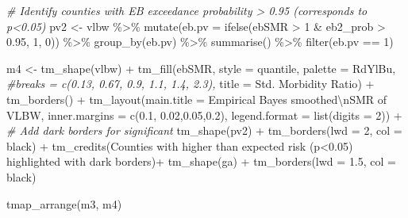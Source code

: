 \documentclass[
]{book}
\newenvironment{Shaded}{\begin{snugshade}}{\end{snugshade}}
\newcommand{\AttributeTok}[1]{\textcolor[rgb]{0.77,0.63,0.00}{#1}}
\newcommand{\CommentTok}[1]{\textcolor[rgb]{0.56,0.35,0.01}{\textit{#1}}}
\newcommand{\DecValTok}[1]{\textcolor[rgb]{0.00,0.00,0.81}{#1}}
\newcommand{\FloatTok}[1]{\textcolor[rgb]{0.00,0.00,0.81}{#1}}
\newcommand{\FunctionTok}[1]{\textcolor[rgb]{0.00,0.00,0.00}{#1}}
\newcommand{\NormalTok}[1]{#1}
\newcommand{\OtherTok}[1]{\textcolor[rgb]{0.56,0.35,0.01}{#1}}
\newcommand{\SpecialCharTok}[1]{\textcolor[rgb]{0.00,0.00,0.00}{#1}}
\newcommand{\StringTok}[1]{\textcolor[rgb]{0.31,0.60,0.02}{#1}}
\begin{document}
\begin{Shaded}
\begin{Highlighting}[]
\CommentTok{\# Identify counties with EB exceedance probability \textgreater{} 0.95 (corresponds to p\textless{}0.05)}
\NormalTok{pv2 }\OtherTok{\textless{}{-}}\NormalTok{ vlbw }\SpecialCharTok{\%\textgreater{}\%}
  \FunctionTok{mutate}\NormalTok{(}\AttributeTok{eb.pv =} \FunctionTok{ifelse}\NormalTok{(ebSMR }\SpecialCharTok{\textgreater{}} \DecValTok{1} \SpecialCharTok{\&}\NormalTok{ eb2\_prob }\SpecialCharTok{\textgreater{}} \FloatTok{0.95}\NormalTok{, }\DecValTok{1}\NormalTok{, }\DecValTok{0}\NormalTok{)) }\SpecialCharTok{\%\textgreater{}\%}
  \FunctionTok{group\_by}\NormalTok{(eb.pv) }\SpecialCharTok{\%\textgreater{}\%}
  \FunctionTok{summarise}\NormalTok{() }\SpecialCharTok{\%\textgreater{}\%}
  \FunctionTok{filter}\NormalTok{(eb.pv }\SpecialCharTok{==} \DecValTok{1}\NormalTok{)}

\NormalTok{m4 }\OtherTok{\textless{}{-}} \FunctionTok{tm\_shape}\NormalTok{(vlbw) }\SpecialCharTok{+}
  \FunctionTok{tm\_fill}\NormalTok{(}\StringTok{\textquotesingle{}ebSMR\textquotesingle{}}\NormalTok{,}
          \AttributeTok{style =} \StringTok{\textquotesingle{}quantile\textquotesingle{}}\NormalTok{,}
          \AttributeTok{palette =} \StringTok{\textquotesingle{}{-}RdYlBu\textquotesingle{}}\NormalTok{,}
          \CommentTok{\#breaks = c(0.13, 0.67, 0.9, 1.1, 1.4, 2.3),}
          \AttributeTok{title =} \StringTok{\textquotesingle{}Std. Morbidity Ratio\textquotesingle{}}\NormalTok{) }\SpecialCharTok{+} 
  \FunctionTok{tm\_borders}\NormalTok{() }\SpecialCharTok{+}
  \FunctionTok{tm\_layout}\NormalTok{(}\AttributeTok{main.title =} \StringTok{\textquotesingle{}Empirical Bayes smoothed}\SpecialCharTok{\textbackslash{}n}\StringTok{SMR of VLBW\textquotesingle{}}\NormalTok{,}
            \AttributeTok{inner.margins =} \FunctionTok{c}\NormalTok{(}\FloatTok{0.1}\NormalTok{, }\FloatTok{0.02}\NormalTok{,}\FloatTok{0.05}\NormalTok{,}\FloatTok{0.2}\NormalTok{),}
            \AttributeTok{legend.format =} \FunctionTok{list}\NormalTok{(}\AttributeTok{digits =} \DecValTok{2}\NormalTok{)) }\SpecialCharTok{+}
  \CommentTok{\# Add dark borders for significant}
  \FunctionTok{tm\_shape}\NormalTok{(pv2) }\SpecialCharTok{+}
  \FunctionTok{tm\_borders}\NormalTok{(}\AttributeTok{lwd =} \DecValTok{2}\NormalTok{, }\AttributeTok{col =} \StringTok{\textquotesingle{}black\textquotesingle{}}\NormalTok{) }\SpecialCharTok{+}
  \FunctionTok{tm\_credits}\NormalTok{(}\StringTok{\textquotesingle{}Counties with higher than expected risk (p\textless{}0.05) highlighted with dark borders\textquotesingle{}}\NormalTok{)}\SpecialCharTok{+}
  \FunctionTok{tm\_shape}\NormalTok{(ga) }\SpecialCharTok{+}
  \FunctionTok{tm\_borders}\NormalTok{(}\AttributeTok{lwd =} \FloatTok{1.5}\NormalTok{, }\AttributeTok{col =} \StringTok{\textquotesingle{}black\textquotesingle{}}\NormalTok{)}

\FunctionTok{tmap\_arrange}\NormalTok{(m3, m4)}
\end{Highlighting}
\end{Shaded}
\end{document}
